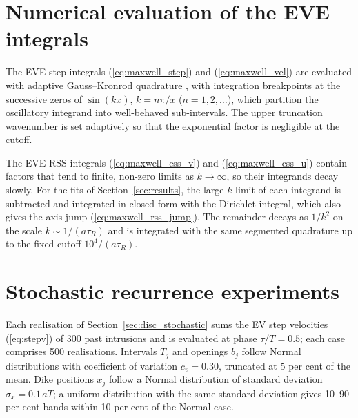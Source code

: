 \documentclass[extra]{gji}
\begin{document}
\section{Numerical evaluation of the EVE integrals}
\label{app:numerics}

The EVE step integrals (\ref{eq:maxwell_step}) and (\ref{eq:maxwell_vel})
are evaluated with adaptive Gauss--Kronrod quadrature
\citep{laurie1997calculation}, with integration breakpoints at the
successive zeros of $\sin(kx)$, $k = n\pi/x$ ($n = 1,2,\ldots$), which
partition the oscillatory integrand into well-behaved sub-intervals. The
upper truncation wavenumber is set adaptively so that the exponential factor
is negligible at the cutoff.

The EVE RSS integrals (\ref{eq:maxwell_css_v}) and (\ref{eq:maxwell_css_u})
contain factors that tend to finite, non-zero limits as $k\to\infty$, so
their integrands decay slowly. For the fits of Section~\ref{sec:results},
the large-$k$ limit of each integrand is subtracted and integrated in closed
form with the Dirichlet integral, which also gives the axis jump
(\ref{eq:maxwell_rss_jump}). The remainder decays as $1/k^2$ on the scale
$k \sim 1/(a\tau_R)$ and is integrated with the same segmented quadrature
up to the fixed cutoff $10^4/(a\tau_R)$.

\section{Stochastic recurrence experiments}
\label{app:stochastic}

Each realisation of Section~\ref{sec:disc_stochastic} sums the EV step
velocities (\ref{eq:stepv}) of 300 past intrusions and is evaluated at
phase $\tau/T = 0.5$; each case comprises 500 realisations.  Intervals
$T_j$ and openings $b_j$ follow Normal distributions with coefficient of
variation $c_v = 0.30$, truncated at 5 per cent of the mean.  Dike
positions $x_j$ follow a Normal distribution of standard deviation
$\sigma_x = 0.1\,aT$; a uniform distribution with the same standard
deviation gives 10--90 per cent bands within 10 per cent of the Normal
case.


\label{lastpage}
\end{document}
